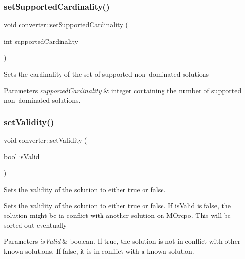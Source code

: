 \subsubsection{\texorpdfstring{set\+Supported\+Cardinality()}{setSupportedCardinality()}}
{\footnotesize\ttfamily void converter\+::set\+Supported\+Cardinality (\begin{DoxyParamCaption}\item[{int}]{supported\+Cardinality }\end{DoxyParamCaption})\hspace{0.3cm}{\ttfamily [inline]}}

Sets the cardinality of the set of supported non--dominated solutions 
\begin{DoxyParams}{Parameters}
{\em supported\+Cardinality} & integer containing the number of supported non--dominated solutions. \\
\hline
\end{DoxyParams}
\mbox{\label{classconverter_a84384742ccd6d989c0e3f0fa6e3cbfa0}} 
\subsubsection{\texorpdfstring{set\+Validity()}{setValidity()}}
{\footnotesize\ttfamily void converter\+::set\+Validity (\begin{DoxyParamCaption}\item[{bool}]{is\+Valid }\end{DoxyParamCaption})\hspace{0.3cm}{\ttfamily [inline]}}



Sets the validity of the solution to either true or false. 

Sets the validity of the solution to either true or false. If is\+Valid is false, the solution might be in conflict with another solution on M\+Orepo. This will be sorted out eventually 
\begin{DoxyParams}{Parameters}
{\em is\+Valid} & boolean. If true, the solution is not in conflict with other known solutions. If false, it is in conflict with a known solution. \\
\hline
\end{DoxyParams}
\mbox{\label{classconverter_a825aad7cfc1aabfbef527d064a6edf1e}} 
